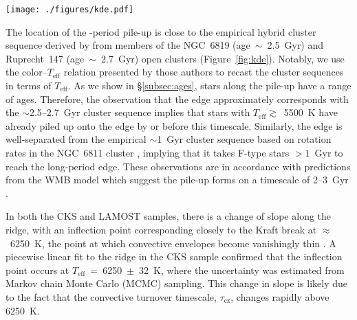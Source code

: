 \documentclass[trackchanges,twocolumn]{aastex631}
\newcommand{\taucz}{$\tau_\mathrm{cz}$\xspace}
\newcommand{\lamostmcq}{LAMOST--McQuillan\xspace}
\newcommand{\teffmin}{5500~K\xspace}
\newcommand{\teff}{\ensuremath{T_{\mathrm{eff}}}\xspace}
\newcommand{\prot}{\ensuremath{P_\mathrm{rot}}\xspace}
\begin{document}
\begin{figure*}
    \centering
    \texttt{[image: ./figures/kde.pdf]}
    \caption{Gaussian kernel density estimation (blue contours) of the \teff--\prot distributions of the CKS--McQuillan, \lamostmcq, and asteroseismic \citet{Hall2021} samples, from left to right. Empirical cluster sequences from \citet{Curtis2020} are shown by the dark grey lines. The orange dashed lines show constant Rossby curves of fiducial values (see \S\ref{subsec:rossby}). The short-period pile-up can be observed in the LAMOST--McQuillan sample for \teff~$\gtrsim$~5500~K. The orange point indicates the Sun's temperature and equatorial rotation period, with the errorbar capturing the range of periods measured from its differentially rotating surface.}
    \label{fig:kde}
\end{figure*}

The location of the -period pile-up is close to the empirical hybrid cluster sequence derived by \citet{Curtis2020} from members of the NGC~6819 (age~$\sim$~2.5~Gyr) and Ruprecht~147 (age~$\sim$~2.7~Gyr) open clusters (Figure~\ref{fig:kde}). Notably, we use the color--\teff relation presented by those authors to recast the cluster sequences in terms of \teff. As we show in \S\ref{subsec:ages}, stars along the pile-up have a range of ages. Therefore, the observation that the edge approximately corresponds with the $\sim$2.5--2.7~Gyr cluster sequence implies that stars with \teff$\gtrsim$~\teffmin have already piled up onto the edge by or before this timescale. Similarly, the edge is well-separated from the empirical $\sim$1~Gyr cluster sequence based on rotation rates in the NGC~6811 cluster \citep{Curtis2019a, Curtis2020}, implying that it takes F-type stars $>1$~Gyr to reach the long-period edge. These observations are in accordance with predictions from the WMB model which suggest the pile-up forms on a timescale of 2--3~Gyr \citep{vanSaders2019}.

In both the CKS and LAMOST samples, there is a change of slope along the ridge, with an inflection point corresponding closely to the Kraft break at $\approx$~6250~K, the point at which convective envelopes become vanishingly thin \citep{Kraft1967}. A piecewise linear fit to the ridge in the CKS sample confirmed that the inflection point occurs at \teff~=~6250~$\pm$~32~K, where the uncertainty was estimated from Markov chain Monte Carlo (MCMC) sampling. This change in slope is likely due to the fact that the convective turnover timescale, \taucz, changes rapidly above 6250~K.
\end{document}
